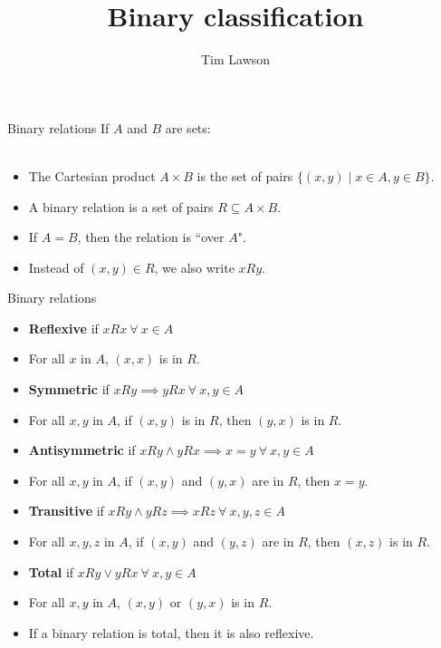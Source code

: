 \documentclass[10pt]{beamer}
\title{Binary classification}
\author{Tim Lawson}
\begin{document}
\maketitle

\begin{frame}
	{Binary relations}
	If $A$ and $B$ are sets:
	\\~\
	\begin{itemize}
		\item The Cartesian product $A \times B$ is the set of pairs $\{(x, y) \mid x \in A, y \in B \}$.
		\item A binary relation is a set of pairs $R \subseteq A \times B$.
		\item If $A = B$, then the relation is ``over $A$".
		\item Instead of $(x, y) \in R$, we also write $xRy$.
	\end{itemize}
\end{frame}

\begin{frame}
	{Binary relations}
	\begin{itemize}
		\item \textbf{Reflexive} if $xRx\ \forall\ x \in A$
		\item[] For all $x$ in $A$, $(x, x)$ is in $R$.
		\item \textbf{Symmetric} if $xRy \implies yRx\ \forall\ x,y \in A$
		\item[] For all $x, y$ in $A$, if $(x, y)$ is in $R$, then $(y, x)$ is in $R$.
		\item \textbf{Antisymmetric} if $xRy \land yRx \implies x=y\ \forall\ x,y \in A$
		\item[] For all $x, y$ in $A$, if $(x, y)$ and $(y, x)$ are in $R$, then $x = y$.
		\item \textbf{Transitive} if $xRy \land yRz \implies xRz\ \forall\ x,y,z \in A$
		\item[] For all $x,y,z$ in $A$, if $(x, y)$ and $(y, z)$ are in $R$, then $(x, z)$ is in $R$.
		\item \textbf{Total} if $xRy \lor yRx\ \forall\ x,y \in A$
		\item[] For all $x, y$ in $A$, $(x, y)$ or $(y, x)$ is in $R$.
		\item[] If a binary relation is total, then it is also reflexive.
	\end{itemize}
\end{frame}
\end{document}
